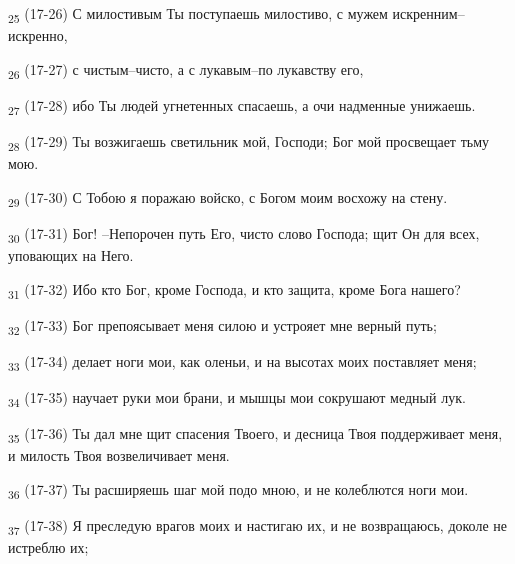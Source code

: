 \begin{tcolorbox}
\textsubscript{25} (17-26) С милостивым Ты поступаешь милостиво, с мужем искренним--искренно,
\end{tcolorbox}
\begin{tcolorbox}
\textsubscript{26} (17-27) с чистым--чисто, а с лукавым--по лукавству его,
\end{tcolorbox}
\begin{tcolorbox}
\textsubscript{27} (17-28) ибо Ты людей угнетенных спасаешь, а очи надменные унижаешь.
\end{tcolorbox}
\begin{tcolorbox}
\textsubscript{28} (17-29) Ты возжигаешь светильник мой, Господи; Бог мой просвещает тьму мою.
\end{tcolorbox}
\begin{tcolorbox}
\textsubscript{29} (17-30) С Тобою я поражаю войско, с Богом моим восхожу на стену.
\end{tcolorbox}
\begin{tcolorbox}
\textsubscript{30} (17-31) Бог! --Непорочен путь Его, чисто слово Господа; щит Он для всех, уповающих на Него.
\end{tcolorbox}
\begin{tcolorbox}
\textsubscript{31} (17-32) Ибо кто Бог, кроме Господа, и кто защита, кроме Бога нашего?
\end{tcolorbox}
\begin{tcolorbox}
\textsubscript{32} (17-33) Бог препоясывает меня силою и устрояет мне верный путь;
\end{tcolorbox}
\begin{tcolorbox}
\textsubscript{33} (17-34) делает ноги мои, как оленьи, и на высотах моих поставляет меня;
\end{tcolorbox}
\begin{tcolorbox}
\textsubscript{34} (17-35) научает руки мои брани, и мышцы мои сокрушают медный лук.
\end{tcolorbox}
\begin{tcolorbox}
\textsubscript{35} (17-36) Ты дал мне щит спасения Твоего, и десница Твоя поддерживает меня, и милость Твоя возвеличивает меня.
\end{tcolorbox}
\begin{tcolorbox}
\textsubscript{36} (17-37) Ты расширяешь шаг мой подо мною, и не колеблются ноги мои.
\end{tcolorbox}
\begin{tcolorbox}
\textsubscript{37} (17-38) Я преследую врагов моих и настигаю их, и не возвращаюсь, доколе не истреблю их;
\end{tcolorbox}
